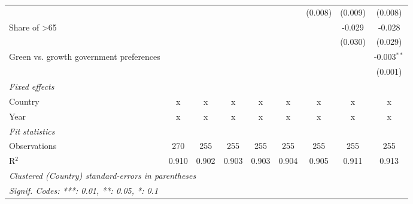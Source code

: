 \begin{table}[htbp]
\begin{tabular}{lcccccccc}
                                                        &         &         &         &         &         & (0.008) & (0.009) & (0.008)\\   
      Share of >65                                      &         &         &         &         &         &         & -0.029  & -0.028\\   
                                                        &         &         &         &         &         &         & (0.030) & (0.029)\\   
      Green vs. growth government preferences           &         &         &         &         &         &         &         & -0.003$^{**}$\\   
                                                        &         &         &         &         &         &         &         & (0.001)\\   
      \emph{Fixed effects}\\
      Country                                           & x       & x       & x       & x       & x       & x       & x       & x\\  
      Year                                              & x       & x       & x       & x       & x       & x       & x       & x\\  
      \midrule \emph{Fit statistics}\\
      Observations                                      & 270     & 255     & 255     & 255     & 255     & 255     & 255     & 255\\  
      R$^2$                                             & 0.910   & 0.902   & 0.903   & 0.903   & 0.904   & 0.905   & 0.911   & 0.913\\  
      \midrule
      \multicolumn{9}{l}{\emph{Clustered (Country) standard-errors in parentheses}}\\
      \multicolumn{9}{l}{\emph{Signif. Codes: ***: 0.01, **: 0.05, *: 0.1}}\\
   \end{tabular}
\end{table}


